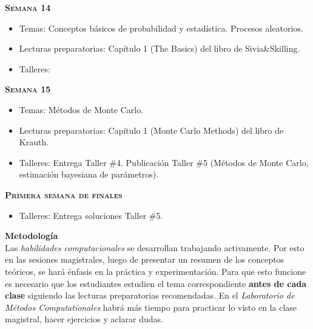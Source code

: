 \documentclass[letterpaper,10pt,onecolumn]{article}
\begin{document}
\noindent\textbf{\textsc{Semana 14}}\\[-0.5cm]
\begin{itemize}
\item Temas: Conceptos b\'asicos de
  probabilidad y estad\'istica. Procesos aleatorios. \\[-0.6cm]  
\item Lecturas preparatorias: Cap\'itulo 1 (The Basics) del libro de
  Sivia\&Skilling. \\[-0.6cm]
\item Talleres: 
\\[-0.6cm]
\end{itemize}

\noindent\textbf{\textsc{Semana 15}}\\[-0.5cm]
\begin{itemize}
\item Temas: M\'etodos de Monte Carlo. \\[-0.6cm]
\item Lecturas preparatorias: Cap\'itulo 1 (Monte Carlo Methods) del
  libro de Krauth.\\[-0.6cm]
\item Talleres: Entrega Taller \#4. Publicaci\'on Taller \#5
  (M\'etodos de Monte Carlo, estimaci\'on bayesiana de par\'ametros). \\[-0.6cm]
\end{itemize}

\noindent\textbf{\textsc{Primera semana de finales}}\\[-0.5cm]
\begin{itemize}
\item Talleres:
Entrega soluciones Taller \#5. 
\\[-0.6cm]
\end{itemize}


\vspace*{0.5cm} 
\noindent\textbf{\large {} \quad
  Metodolog\'ia}\\[-0.2cm] 


\noindent\normalsize 
Las \emph{habilidades computacionales} se desarrollan trabajando activamente. 
Por esto en las sesiones magistrales, luego de presentar un resumen de
los conceptos te\'oricos, se har\'a \'enfasis en la pr\'actica y
experimentaci\'on.   
Para que esto funcione es necesario que los estudiantes estudien el
tema correspondiente {\bf antes de cada clase} siguiendo las lecturas
preparatorias recomendadas. En el \emph{Laboratorio de M\'etodos
  Computationales} habr\'a m\'as tiempo para practicar lo visto en la
clase magistral, hacer ejercicios y aclarar dudas.   
\end{document}
